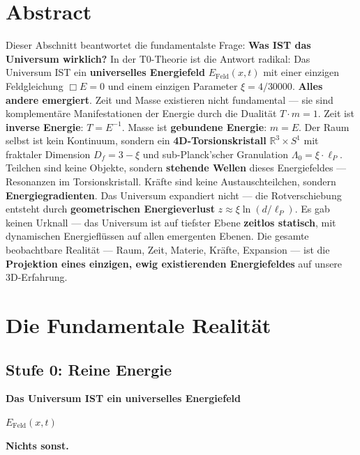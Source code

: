 \section*{Abstract}
		Dieser Abschnitt beantwortet die fundamentalste Frage: \textbf{Was IST das Universum wirklich?} In der T0-Theorie ist die Antwort radikal: Das Universum IST ein \textbf{universelles Energiefeld} $E_{\text{Feld}}(x,t)$ mit einer einzigen Feldgleichung $\Box E = 0$ und einem einzigen Parameter $\xi = 4/30000$. \textbf{Alles andere emergiert}. Zeit und Masse existieren nicht fundamental — sie sind komplementäre Manifestationen der Energie durch die Dualität $T \cdot m = 1$. Zeit ist \textbf{inverse Energie}: $T = E^{-1}$. Masse ist \textbf{gebundene Energie}: $m = E$. Der Raum selbst ist kein Kontinuum, sondern ein \textbf{4D-Torsionskristall} $\mathbb{R}^3 \times S^1$ mit fraktaler Dimension $D_f = 3-\xi$ und sub-Planck'scher Granulation $\Lambda_0 = \xi \cdot \ell_P$. Teilchen sind keine Objekte, sondern \textbf{stehende Wellen} dieses Energiefeldes — Resonanzen im Torsionskristall. Kräfte sind keine Austauschteilchen, sondern \textbf{Energiegradienten}. Das Universum expandiert nicht — die Rotverschiebung entsteht durch \textbf{geometrischen Energieverlust} $z \approx \xi \ln(d/\ell_P)$. Es gab keinen Urknall — das Universum ist auf tiefster Ebene \textbf{zeitlos statisch}, mit dynamischen Energieflüssen auf allen emergenten Ebenen. Die gesamte beobachtbare Realität — Raum, Zeit, Materie, Kräfte, Expansion — ist die \textbf{Projektion eines einzigen, ewig existierenden Energiefeldes} auf unsere 3D-Erfahrung.

	
	\section{Die Fundamentale Realität}
	
	\subsection{Stufe 0: Reine Energie}
	
	\begin{revolutionary}[Was das Universum IST]
		
		\begin{center}
			\textbf{Das Universum IST ein universelles Energiefeld}
			
			\vspace{0.3cm}
			
			$E_{\text{Feld}}(x,t)$
			
			\vspace{0.3cm}
			
			\textbf{Nichts sonst.}
		\end{center}
		\normalsize
	\end{revolutionary}
	
